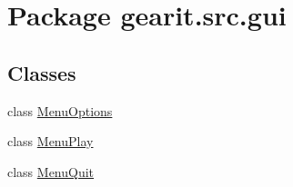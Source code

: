 \hypertarget{namespacegearit_1_1src_1_1gui}{\section{Package gearit.\+src.\+gui}
\label{namespacegearit_1_1src_1_1gui}
}
\subsection*{Classes}
\begin{DoxyCompactItemize}
\item 
class \hyperlink{classgearit_1_1src_1_1gui_1_1_menu_options}{Menu\+Options}
\item 
class \hyperlink{classgearit_1_1src_1_1gui_1_1_menu_play}{Menu\+Play}
\item 
class \hyperlink{classgearit_1_1src_1_1gui_1_1_menu_quit}{Menu\+Quit}
\end{DoxyCompactItemize}
